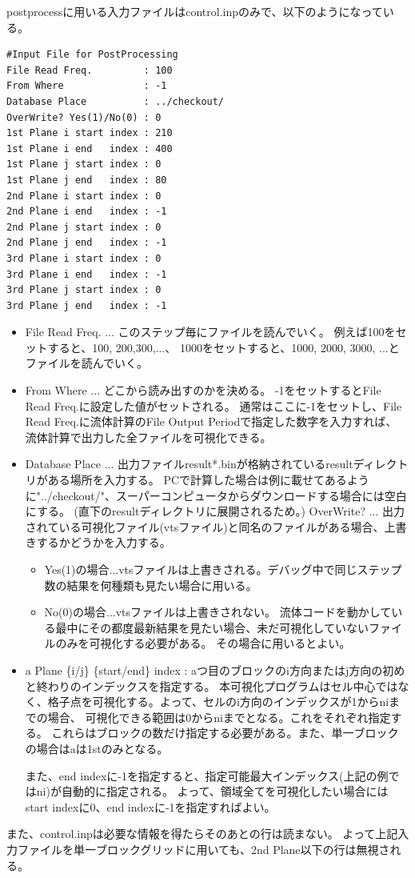 \documentclass{jsarticle}
\begin{document}
postprocessに用いる入力ファイルはcontrol.inpのみで、以下のようになっている。
\begin{verbatim}
#Input File for PostProcessing
File Read Freq.         : 100
From Where              : -1
Database Place          : ../checkout/
OverWrite? Yes(1)/No(0) : 0
1st Plane i start index : 210
1st Plane i end   index : 400
1st Plane j start index : 0
1st Plane j end   index : 80 
2nd Plane i start index : 0
2nd Plane i end   index : -1
2nd Plane j start index : 0
2nd Plane j end   index : -1
3rd Plane i start index : 0
3rd Plane i end   index : -1
3rd Plane j start index : 0
3rd Plane j end   index : -1
\end{verbatim}
\begin{itemize}
\item File Read Freq. ... このステップ毎にファイルを読んでいく。
例えば100をセットすると、100, 200,300,...、
1000をセットすると、1000, 2000, 3000, ...とファイルを読んでいく。
\item From Where ... どこから読み出すのかを決める。
-1をセットするとFile Read Freq.に設定した値がセットされる。
通常はここに-1をセットし、File Read Freq.に流体計算のFile Output Periodで指定した数字を入力すれば、
流体計算で出力した全ファイルを可視化できる。
\item Database Place ... 出力ファイルresult*.binが格納されているresultディレクトリがある場所を入力する。
PCで計算した場合は例に載せてあるように"../checkout/"、スーパーコンピュータからダウンロードする場合には空白にする。
(直下のresultディレクトリに展開されるため。)
OverWrite? ... 出力されている可視化ファイル(vtsファイル)と同名のファイルがある場合、上書きするかどうかを入力する。
\begin{itemize}
\item Yes(1)の場合...vtsファイルは上書きされる。デバッグ中で同じステップ数の結果を何種類も見たい場合に用いる。
\item No(0)の場合...vtsファイルは上書きされない。
流体コードを動かしている最中にその都度最新結果を見たい場合、未だ可視化していないファイルのみを可視化する必要がある。
その場合に用いるとよい。
\end{itemize}
\item a Plane \{i/j\} \{start/end\} index : aつ目のブロックのi方向またはj方向の初めと終わりのインデックスを指定する。
本可視化プログラムはセル中心ではなく、格子点を可視化する。よって、セルのi方向のインデックスが1からniまでの場合、
可視化できる範囲は0からniまでとなる。これをそれぞれ指定する。
これらはブロックの数だけ指定する必要がある。また、単一ブロックの場合はaは1stのみとなる。

また、end indexに-1を指定すると、指定可能最大インデックス(上記の例ではni)が自動的に指定される。
よって、領域全てを可視化したい場合にはstart indexに0、end indexに-1を指定すればよい。
\end{itemize}
また、control.inpは必要な情報を得たらそのあとの行は読まない。
よって上記入力ファイルを単一ブロックグリッドに用いても、2nd Plane以下の行は無視される。
\end{document}
